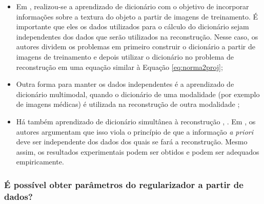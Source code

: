 \begin{itemize}
\item Em \cite{Soltani2017, Soltani2016}, realizou-se a aprendizado de dicionário com o objetivo de incorporar informações sobre a textura do objeto a partir de imagens de treinamento. É importante que eles os dados utilizados para o cálculo do dicionário sejam independentes dos dados que serão utilizados na reconstrução. Nesse caso, os autores dividem os problemas em primeiro construir o dicionário a partir de imagens de treinamento e depois utilizar o dicionário no problema de reconstrução em uma equação similar à Equação \eqref{eq:norma2proj};

\item Outra forma para manter os dados independentes é a aprendizado de dicionário multimodal, quando o dicionário de uma modalidade (por exemplo de imagens médicas) é utilizada na reconstrução de outra modalidade \cite{TONG2016153}; 

\item Há também aprendizado de dicionário simultânea à reconstrução \cite[pág. 54]{Arridge2019}, \cite{LewisD2019}. Em \cite{Soltani2017, Soltani2016}, os autores argumentam que isso viola o princípio de que a informação \textit{a priori} deve ser independente dos dados dos quais se fará a reconstrução. Mesmo assim, os resultados experimentais podem ser obtidos e podem ser adequados empiricamente.
 
\end{itemize}

\subsubsection{É possível obter parâmetros do regularizador a partir de dados?}

